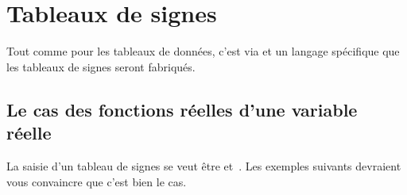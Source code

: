 \documentclass{tutodoc}
\begin{document}
\section{Tableaux de signes}

\begin{tdocnote}
	Tout comme pour les tableaux de données, c'est via  et un langage spécifique que les tableaux de signes seront fabriqués.
\end{tdocnote}




\subsection{Le cas des fonctions réelles d'une variable réelle}

La saisie d'un tableau de signes se veut être  et \,. Les exemples suivants devraient vous convaincre que c'est bien le cas.
\end{document}
